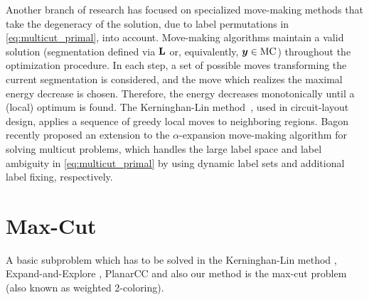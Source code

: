 %

Another branch of research has focused on specialized move-making methods
\cite{kerninghan_1970_bell,zhao_2005_mp,bagon_2011_arxiv}
that take the degeneracy of the solution,
due to label permutations in \eqref{eq:multicut_primal}, into account.
%
Move-making algorithms maintain a valid solution (segmentation defined 
via $\mathbf{L}$ or, equivalently, $\boldsymbol y \in \text{MC}$) throughout the
optimization procedure. In each step, a set of possible moves transforming
the current segmentation is considered,
and the move which realizes the maximal
energy decrease is chosen. Therefore, the energy decreases monotonically
until a (local) optimum is found.
%
The Kerninghan-Lin method~\cite{kerninghan_1970_bell},
used in circuit-layout design, applies a sequence of 
greedy local moves to neighboring regions.
Bagon~\cite{bagon_2011_arxiv} recently proposed an 
extension to the
$\alpha$-expansion move-making algorithm
for solving multicut problems, which handles the large label space
and label ambiguity in \eqref{eq:multicut_primal} by using dynamic label
sets and additional label fixing, respectively.







\section{Max-Cut\label{sec:max_cut}}
A basic subproblem which has to be solved in
the Kerninghan-Lin method \cite{kerninghan_1970_bell},
Expand-and-Explore \cite{bagon_2011_arxiv},
PlanarCC \cite{yarkony_2012_eccv} and also our method is the
max-cut problem \cite{deza1997geometry} (also known as weighted 2-coloring).

